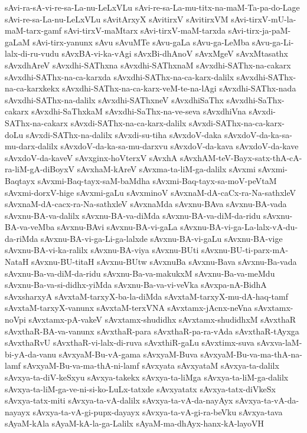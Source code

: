 {sAvi-ra-sA-vi-re-sa-La-nu-LeLxVLu
sAvi-re-sa-La-mu-titx-na-maM-Ta-pa-do-Lage
sAvi-re-sa-La-nu-LeLxVLu
sAvitArxyX
sAvitirxV
sAvitirxVM
sAvi-tirxV-mU-la-maM-tarx-gamf
sAvi-tirxV-maMtarx
sAvi-tirxV-maM-tarxda
sAvi-tirx-ja-paM-gaLaM
sAvi-tirx-yanunx
sAvu
sAvuMTe
sAvu-gaLa
sAvu-ga-LeMba
sAvu-ga-Li-lalx-di-ru-vudu
sAvxBA-vi-ka-vAgi
sAvxBi-dhAnoV
sAvxMgeV
sAvxMtasathx
sAvxdhAreV
sAvxdhi-SAThxna
sAvxdhi-SAThxnaM
sAvxdhi-SAThx-na-cakarx
sAvxdhi-SAThx-na-ca-karxda
sAvxdhi-SAThx-na-ca-karx-dalilx
sAvxdhi-SAThx-na-ca-karxkekx
sAvxdhi-SAThx-na-ca-karx-veM-te-na-lAgi
sAvxdhi-SAThx-nada
sAvxdhi-SAThx-na-dalilx
sAvxdhi-SAThxneV
sAvxdhiSaThx
sAvxdhi-SaThx-cakarx
sAvxdhi-SaThxkaM
sAvxdhi-SaThx-na-ve-seva
sAvxdhiVna
sAvxdi-SAThx-na-cakarx
sAvxdi-SAThx-na-ca-karx-dalilx
sAvxdi-SAThx-na-ca-karx-doLu
sAvxdi-SAThx-na-dalilx
sAvxdi-su-tiha
sAvxdoV-daka
sAvxdoV-da-ka-sa-mu-darx-dalilx
sAvxdoV-da-ka-sa-mu-darxvu
sAvxdoV-da-kava
sAvxdoV-da-kave
sAvxdoV-da-kaveV
sAvxginx-hoVterxV
sAvxhA
sAvxhAM-teV-Bayx-satx-thA-cA-ra-liM-gA-diBoyxV
sAvxhaM-kAreV
sAvxma-ta-liM-ga-dalilx
sAvxmi
sAvxmi-Baqtayx
sAvxmi-Baq-tayx-saM-baMdha
sAvxmi-Baq-tayx-sa-moV-peVtaM
sAvxmi-dorxV-hige
sAvxmi-gaLu
sAvxminoV
sAvxnaM-dA-caCx-ra-Na-sathxleV
sAvxnaM-dA-cacx-ra-Na-sathxleV
sAvxnaMda
sAvxnu-BAva
sAvxnu-BA-vada
sAvxnu-BA-va-dalilx
sAvxnu-BA-va-diMda
sAvxnu-BA-va-diM-da-ridu
sAvxnu-BA-va-veMba
sAvxnu-BAvi
sAvxnu-BA-vi-gaLa
sAvxnu-BA-vi-ga-La-lalx-vA-du-da-riMda
sAvxnu-BA-vi-ga-Li-ga-lalxde
sAvxnu-BA-vi-gaLu
sAvxnu-BA-vige
sAvxnu-BA-vi-ka-ralilx
sAvxnu-BA-viya
sAvxnu-BUti
sAvxnu-BU-ti-parx-mA-NataH
sAvxnu-BU-titaH
sAvxnu-BUtw
sAvxnuBa
sAvxnu-Bava
sAvxnu-Ba-vada
sAvxnu-Ba-va-diM-da-ridu
sAvxnu-Ba-va-makukxM
sAvxnu-Ba-va-meMdu
sAvxnu-Ba-va-si-didhx-yiMda
sAvxnu-Ba-va-vi-veVka
sAvxpa-nA-BidhA
sAvxsharxyA
sAvxtaM-tarxyX-ba-la-diMda
sAvxtaM-tarxyX-mu-dA-haq-tamf
sAvxtaM-tarxyX-vanunx
sAvxtaM-terxVNA
sAvxtamx-jAcnx-neVna
sAvxtamx-noVpi
sAvxtamx-pA-vakeV
sAvxtamx-shudidhx
sAvxtamx-shudidhxM
sAvxthaR
sAvxthaR-BA-va-vanunx
sAvxthaR-para
sAvxthaR-pa-ra-vAda
sAvxthaR-tAyxga
sAvxthaRvU
sAvxthaR-vi-lalx-di-ruva
sAvxthiR-gaLu
sAvxtimx-suva
sAvxva-laM-bi-yA-da-vanu
sAvxyaM-Bu-vA-gama
sAvxyaM-Buva
sAvxyaM-Bu-va-ma-thA-na-lamf
sAvxyaM-Bu-va-ma-thA-ni-lamf
sAvxyata
sAvxyataM
sAvxya-ta-dalilx
sAvxya-ta-diV-keSxyu
sAvxya-takekx
sAvxya-ta-liMga
sAvxya-ta-liM-ga-dalilx
sAvxya-ta-liM-ga-ve-ni-si-ko-LuLx-tatxde
sAvxyatatx
sAvxya-tatx-diVkeSx
sAvxya-tatx-miti
sAvxya-ta-vA-dalilx
sAvxya-ta-vA-da-nayAyx
sAvxya-ta-vA-da-nayayx
sAvxya-ta-vA-gi-pupx-dayayx
sAvxya-ta-vA-gi-ra-beVku
sAvxya-tava
sAyaM-kAla
sAyaM-kA-la-ga-Lalilx
sAyaM-ma-dhAyx-hanx-kA-layoVH
}
